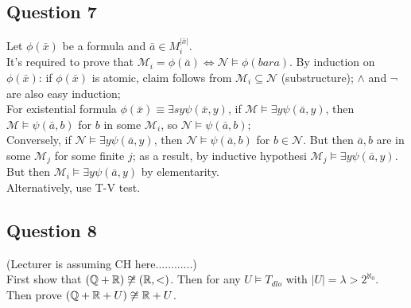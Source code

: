 \documentclass[a4paper]{article}
\begin{document}
\subsection{Question 7}
Let $\phi(\bar{x})$ be a formula and $\bar{a} \in M_i^{|\bar{x}|}$.\\
It's required to prove that $\mathcal{M}_i = \phi(\bar{a}) \iff \mathcal{N} \vDash \phi(bar{a})$. By induction on $\phi(\bar{x})$: if $\phi(\bar{x})$ is atomic, claim follows from $\mathcal{M}_i \subseteq \mathcal{N}$ (substructure); $\wedge$ and $\neg$ are also easy induction;\\
For existential formula $\phi(\bar{x}) \equiv \exists sy \psi(\bar{x},y)$, if $\mathcal{M} \vDash \exists y \psi(\bar{a},y)$, then $\mathcal{M} \vDash \psi(\bar{a},b)$ for $b$ in some $\mathcal{M}_i$, so $\mathcal{N} \vDash \psi(\bar{a},b)$;\\
Conversely, if $\mathcal{N} \vDash \exists y \psi(\bar{a},y)$, then $\mathcal{N} \vDash \psi(\bar{a},b)$ for $b \in \mathcal{N}$. But then $\bar{a},b$ are in some $\mathcal{M}_j$ for some finite $j$; as a result, by inductive hypothesi $\mathcal{M}_j \vDash \exists y \psi (\bar{a},y)$.\\
But then $\mathcal{M}_i \vDash \exists y \psi(\bar{a},y)$ by elementarity.\\
Alternatively, use T-V test.

\subsection{Question 8}
(Lecturer is assuming CH here............)\\
First show that $(\mathbb{Q}+\mathbb{R}) \not\cong (\mathbb{R},<)$. Then for any $U \vDash T_{dlo}$ with $|U| = \lambda > 2^{\aleph_0}$. Then prove $(\mathbb{Q}+\mathbb{R}+U) \not\cong \mathbb{R}+U$.
\end{document}

